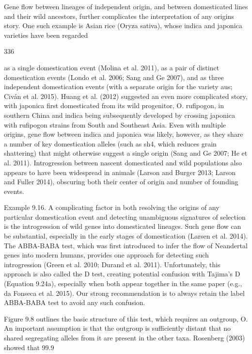 \documentclass{article}
\begin{document}
Gene flow between lineages of independent origin, and between domesticated lines and their wild ancestors, further complicates the interpretation of any origins story. One such example is Asian rice (Oryza sativa), whose indica and japonica varieties have been regarded

336

as a single domestication event (Molina et al. 2011), as a pair of distinct domestication events (Londo et al. 2006; Sang and Ge 2007), and as three independent domestication events (with a separate origin for the variety aus; Civán et al. 2015). Huang et al. (2012) suggested an even more complicated story, with japonica first domesticated from its wild progenitor, O. rufipogon, in southern China and indica being subsequently developed by crossing japonica with rufipogon strains from South and Southeast Asia. Even with multiple origins, gene flow between indica and japonica was likely, however, as they share a number of key domestication alleles (such as sh4, which reduces grain shattering) that might otherwise suggest a single origin (Sang and Ge 2007; He et al. 2011). Introgression between nascent domesticated and wild populations also appears to have been widespread in animals (Larson and Burger 2013; Larson and Fuller 2014), obscuring both their center of origin and number of founding events.

Example 9.16. A complicating factor in both resolving the origins of any particular domestication event and detecting unambiguous signatures of selection is the introgression of wild genes into domesticated lineages. Such gene flow can be substantial, especially in the early stages of domestication (Larsen et al. 2014). The ABBA-BABA test, which was first introduced to infer the flow of Neandertal genes into modern humans, provides one approach for detecting such introgression (Green et al. 2010; Durand et al. 2011). Unfortunately, this approach is also called the D test, creating potential confusion with Tajima's D (Equation 9.24a), especially when both appear together in the same paper (e.g., da Fonseca et al. 2015). Our strong recommendation is to always retain the label ABBA-BABA test to avoid any such confusion.

Figure 9.8 outlines the basic structure of this test, which requires an outgroup, O. An important assumption is that the outgroup is sufficiently distant that no shared segregating alleles from it are present in the other taxa. Rosenberg (2003) showed that 99.9%
\end{document}
